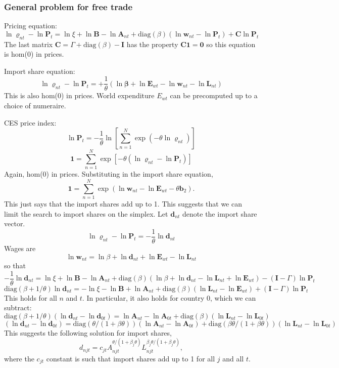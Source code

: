 \documentclass{article}
\begin{document}
\subsubsection{General problem for free trade}
Pricing equation:
\[
\ln\mathbf \varrho_{nt}-\ln\mathbf P_{t} = 
\ln\xi
	+ \ln\mathbf B
	- \ln\mathbf A_{nt}
+\text{diag}(\beta)(\ln\mathbf w_{nt}-\ln\mathbf P_{t})
+ \mathbf C \ln\mathbf P_{t}  
\]
The last matrix $\mathbf C = \Gamma+\text{diag}(\beta)-\mathbf I$ has the property $\mathbf C\mathbf 1=\mathbf 0$ so this equation is hom(0) in prices. 

Import share equation:
\[
\ln\mathbf \varrho_{nt} - \ln\mathbf P_{t} 
 = 
 	+\frac1\theta(\ln\mathbf\beta+\ln \mathbf E_{wt}-\ln \mathbf w_{nt}- \ln \mathbf L_{nt})
\]
This is also hom(0) in prices. World expenditure $E_{wt}$ can be precomputed up to a choice of numeraire.

CES price index:
\[
\ln\mathbf P_{t} = -\frac1\theta
 \ln \left[
 	\sum_{n=1}^N \exp(-\theta \ln \varrho_{nt})
 \right]
\]
\[
\mathbf 1 =  
 	\sum_{n=1}^N \exp[-\theta (\ln \varrho_{nt}-\ln\mathbf P_{t})]
\]
Again, hom(0) in prices. Substituting in the import share equation,
\[
\mathbf 1 =  
 	\sum_{n=1}^N \exp(\ln\mathbf w_{nt}-\ln\mathbf E_{wt}-\theta\mathbf b_2).
\]
This just says that the import shares add up to 1. This suggests that we can limit the search to import shares on the simplex. Let $\mathbf d_{nt}$ denote the import share vector.
\[
\ln\mathbf \varrho_{nt} - \ln\mathbf P_{t} 
 = -\frac1\theta \ln\mathbf d_{nt}
\]
Wages are
\[
\ln\mathbf w_{nt} = \ln\beta+\ln\mathbf d_{nt}+\ln\mathbf E_{wt}-\ln\mathbf L_{nt}
\]
so that
\[
-\frac1\theta \ln\mathbf d_{nt} = 
\ln\xi
	+ \ln\mathbf B
	- \ln\mathbf A_{nt}
+
\text{diag}(\beta)(\ln\beta+\ln\mathbf d_{nt}-\ln\mathbf L_{nt}+\ln\mathbf E_{wt})
- (\mathbf I-\Gamma) \ln\mathbf P_{t}  
\]
\[
\text{diag}(\beta+1/\theta) \ln\mathbf d_{nt} = 
-\ln\xi
	- \ln\mathbf B
	+ \ln\mathbf A_{nt}
+
\text{diag}(\beta)(\ln\mathbf L_{nt}-\ln\mathbf E_{wt})
+ (\mathbf I-\Gamma) \ln\mathbf P_{t}  
\]
This holds for all $n$ and $t$. In particular, it also holds for country $0$, which we can subtract:
\[
\text{diag}(\beta+1/\theta) (\ln\mathbf d_{nt}-\ln\mathbf d_{0t}) = 
	\ln\mathbf A_{nt}-\ln\mathbf A_{0t}
+
\text{diag}(\beta)(\ln\mathbf L_{nt}-\ln\mathbf L_{0t})
\]
\[
(\ln\mathbf d_{nt}-\ln\mathbf d_{0t}) = 
	\text{diag}(\theta/(1+\beta\theta)) (\ln\mathbf A_{nt}-\ln\mathbf A_{0t})
+
\text{diag}(\beta\theta/(1+\beta\theta))(\ln\mathbf L_{nt}-\ln\mathbf L_{0t})
\]
This suggests the following solution for import shares,
\[
d_{njt} = c_{jt}A_{njt}^{\theta/(1+\beta_j\theta)}L_{njt}^{\beta_j\theta/(1+\beta_j\theta)},
\]
where the $c_{jt}$ constant is such that import shares add up to 1 for all $j$ and all $t$.
\end{document}
